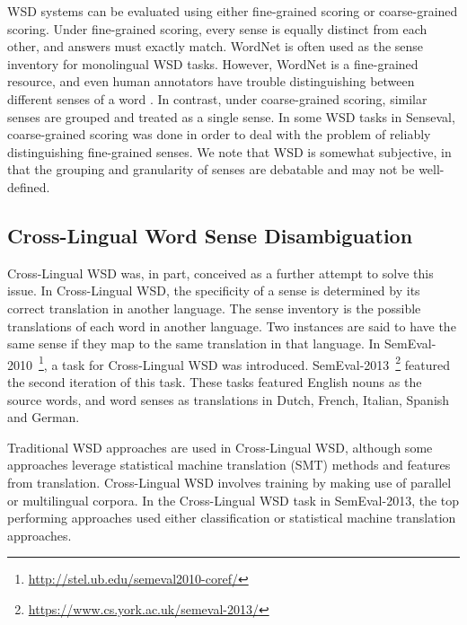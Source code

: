 WSD systems can be evaluated using either fine-grained scoring or
coarse-grained scoring. Under fine-grained scoring, every sense is
equally distinct from each other, and answers must exactly match. 
WordNet is often used as the sense inventory for monolingual WSD tasks. However, WordNet is a fine-grained resource, and even human annotators have
trouble distinguishing between different senses of a word
\cite{edmonds2002introduction}.  In contrast, under coarse-grained
scoring, similar senses are grouped and treated as a single sense.  In
some WSD tasks in Senseval, coarse-grained scoring was done in order
to deal with the problem of reliably distinguishing fine-grained
senses. We note that WSD is somewhat subjective, in that the grouping
and granularity of senses are debatable and may not be well-defined.

\subsection{Cross-Lingual Word Sense Disambiguation}
Cross-Lingual WSD was, in part, conceived as a further attempt to
solve this issue. In Cross-Lingual WSD, the specificity of a sense is
determined by its correct translation in another language. The sense
inventory is the possible translations of each word in another
language. Two instances are said to have the same sense if they map to
the same translation in that language. In
SemEval-2010~\cite{Lefever2010}\footnote{\url{http://stel.ub.edu/semeval2010-coref/}},
a task for Cross-Lingual WSD was
introduced. SemEval-2013~\cite{Lefever2013}\footnote{\url{https://www.cs.york.ac.uk/semeval-2013/}}
featured the second iteration of this task. These tasks featured
English nouns as the source words, and word senses as translations in
Dutch, French, Italian, Spanish and German.

Traditional WSD approaches are used in Cross-Lingual WSD, although
some approaches leverage statistical machine translation (SMT) methods
and features from translation. Cross-Lingual WSD involves training by
making use of parallel or multilingual corpora. In the Cross-Lingual
WSD task in SemEval-2013, the top performing approaches used either
classification or statistical machine translation approaches.

